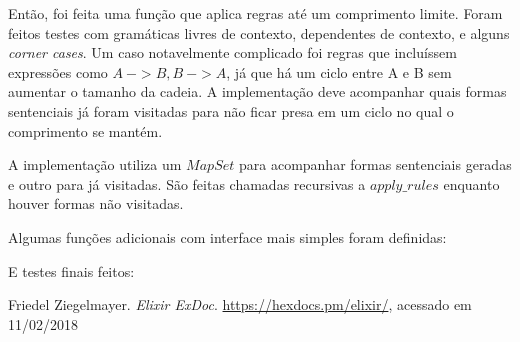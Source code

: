 \documentclass[conference]{IEEEtran}
\begin{document}



Então, foi feita uma função que aplica regras até um comprimento limite. Foram feitos testes com gramáticas livres de contexto, dependentes de contexto, e alguns \emph{corner cases}. Um caso notavelmente complicado foi regras que incluíssem expressões como $A\ -> B, B\ -> A$, já que há um ciclo entre A e B sem aumentar o tamanho da cadeia. A implementação deve acompanhar quais formas sentenciais já foram visitadas para não ficar presa em um ciclo no qual o comprimento se mantém.



A implementação utiliza um $MapSet$ para acompanhar formas sentenciais geradas e outro para já visitadas. São feitas chamadas recursivas a $apply\_rules$ enquanto houver formas não visitadas.



Algumas funções adicionais com interface mais simples foram definidas:



E testes finais feitos:



\begin{thebibliography}{1}
Friedel Ziegelmayer. \emph{Elixir ExDoc}. \url{https://hexdocs.pm/elixir/}, acessado em 11/02/2018
\end{thebibliography}
\end{document}
